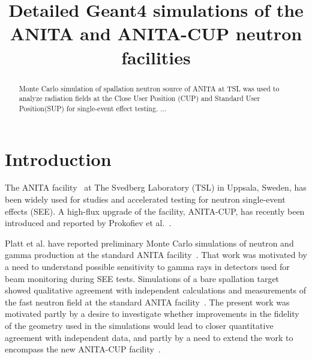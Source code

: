 \documentclass[peerreviewca,11pt,a4paper]{IEEEtran}
\begin{document}
\title{
    Detailed Geant4 simulations of the ANITA and ANITA-CUP neutron facilities
}

\author{
}

\maketitle

\begin{abstract}
    Monte Carlo simulation of spallation neutron source of ANITA at TSL was used to analyze radiation fields at the Close User Position (CUP) and Standard User Position(SUP) for single-event effect testing. ...
\end{abstract}

\IEEEpeerreviewmaketitle

\section{Introduction}

The ANITA facility~\cite{Prokofiev2009} at The Svedberg Laboratory (TSL) in Uppsala, Sweden, has been widely used for studies and accelerated testing for neutron single-event effects (SEE).
A high-flux upgrade of the facility, ANITA-CUP, has recently been introduced and reported by Prokofiev et al.~\cite{Prokofiev2014}.

Platt et al. have reported preliminary Monte Carlo simulations of neutron and gamma production at the standard ANITA facility~\cite{Platt2013}.
That work was motivated by a need to understand possible sensitivity to gamma rays in detectors used for beam monitoring during SEE tests.
Simulations of a bare spallation target showed qualitative agreement with independent calculations and measurements of the fast neutron field at the standard ANITA facility~\cite{Prokofiev2009}.
The present work was motivated partly by a desire to investigate whether improvements in the fidelity of the geometry used in the simulations would lead to closer quantitative agreement with independent data, and partly by a need to extend the work to encompass the new ANITA-CUP facility~\cite{Prokofiev2014}.
\end{document}
